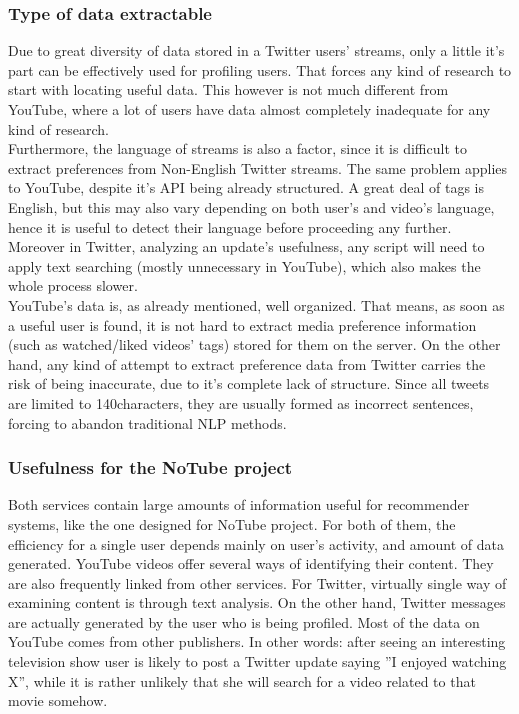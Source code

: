 \subsubsection{Type of data extractable}
Due to great diversity of data stored in a Twitter users' streams, only a little it's part can be effectively used for profiling
users. That forces any kind of research to start with locating useful data. This however is not much different from YouTube, where
a lot of users have data almost completely inadequate for any kind of research.
\\ Furthermore, the language of streams is also a factor, since it is difficult to extract preferences from Non-English Twitter
streams. The same problem applies to YouTube, despite it's API being already structured. A great deal of tags is English,
but this may also vary depending on both user's and video's language, hence it is useful to detect their language before
proceeding any further. Moreover in Twitter, analyzing an update's usefulness, any script will need to apply text searching (mostly
unnecessary in YouTube), which also makes the whole process slower.
\\ YouTube's data is, as already mentioned, well organized. That means, as soon as a useful user is found, it is not hard to
extract media preference information (such as watched/liked videos' tags) stored for them on the server. On the other hand,
any kind of attempt to extract preference data from Twitter carries the risk of being inaccurate, due to it's complete lack of structure.
Since all tweets are limited to 140characters, they are usually formed as incorrect sentences, forcing to abandon traditional
NLP methods.

\subsubsection{Usefulness for the NoTube project}
Both services contain large amounts of information useful for recommender
systems, like the one designed for NoTube project. For both of them, the
efficiency for a single user depends mainly on user's activity, and amount of
data generated. YouTube videos offer several ways of identifying their content.
They are also frequently linked from other services. For Twitter, virtually single
way of examining content is through text analysis. On the other hand, Twitter
messages are actually generated by the user who is being profiled. Most of the data
on YouTube comes from other publishers. In other words: after seeing an
interesting television show user is likely to post a Twitter update saying ''I
enjoyed watching X'', while it is rather unlikely that she will search for a
video related to that movie somehow.

